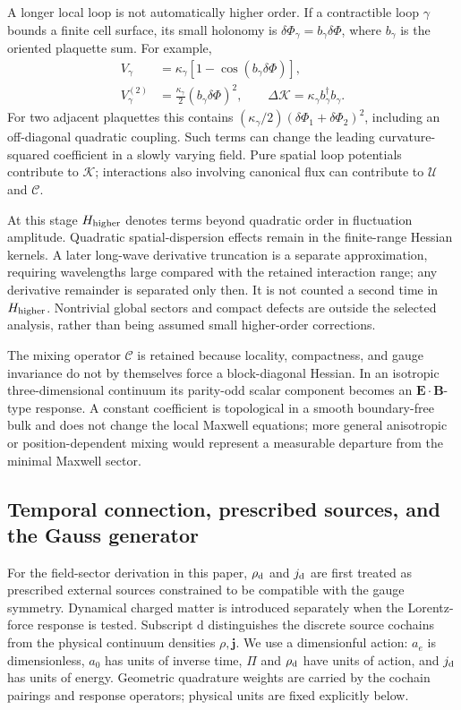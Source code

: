 \documentclass[11pt]{article}
\begin{document}
A longer local loop is not automatically higher order. If a contractible loop $\gamma$ bounds a finite cell surface, its small holonomy is $\delta\Phi_\gamma=b_\gamma\delta\Phi$, where $b_\gamma$ is the oriented plaquette sum. For example,
\begin{equation}
\begin{aligned}
V_\gamma&=\kappa_\gamma[1-\cos(b_\gamma\delta\Phi)],\\
V_\gamma^{(2)}&=\frac{\kappa_\gamma}{2}(b_\gamma\delta\Phi)^2,
\qquad
\Delta\mathcal K=\kappa_\gamma b_\gamma^\dagger b_\gamma.
\end{aligned}
\end{equation}
For two adjacent plaquettes this contains $(\kappa_\gamma/2)(\delta\Phi_1+\delta\Phi_2)^2$, including an off-diagonal quadratic coupling. Such terms can change the leading curvature-squared coefficient in a slowly varying field. Pure spatial loop potentials contribute to $\mathcal K$; interactions also involving canonical flux can contribute to $\mathcal U$ and $\mathcal C$.

At this stage $H_{\rm higher}$ denotes terms beyond quadratic order in fluctuation amplitude. Quadratic spatial-dispersion effects remain in the finite-range Hessian kernels. A later long-wave derivative truncation is a separate approximation, requiring wavelengths large compared with the retained interaction range; any derivative remainder is separated only then. It is not counted a second time in $H_{\rm higher}$. Nontrivial global sectors and compact defects are outside the selected analysis, rather than being assumed small higher-order corrections.

The mixing operator $\mathcal C$ is retained because locality, compactness, and gauge invariance do not by themselves force a block-diagonal Hessian. In an isotropic three-dimensional continuum its parity-odd scalar component becomes an $\mathbf E\!\cdot\!\mathbf B$-type response. A constant coefficient is topological in a smooth boundary-free bulk and does not change the local Maxwell equations; more general anisotropic or position-dependent mixing would represent a measurable departure from the minimal Maxwell sector.

\subsection{Temporal connection, prescribed sources, and the Gauss generator}

For the field-sector derivation in this paper, $\rho_{\rm d}$ and $j_{\rm d}$ are first treated as prescribed external sources constrained to be compatible with the gauge symmetry. Dynamical charged matter is introduced separately when the Lorentz-force response is tested. Subscript $\mathrm d$ distinguishes the discrete source cochains from the physical continuum densities $\rho,\mathbf j$. We use a dimensionful action: $a_e$ is dimensionless, $a_0$ has units of inverse time, $\Pi$ and $\rho_{\rm d}$ have units of action, and $j_{\rm d}$ has units of energy. Geometric quadrature weights are carried by the cochain pairings and response operators; physical units are fixed explicitly below.
\end{document}

